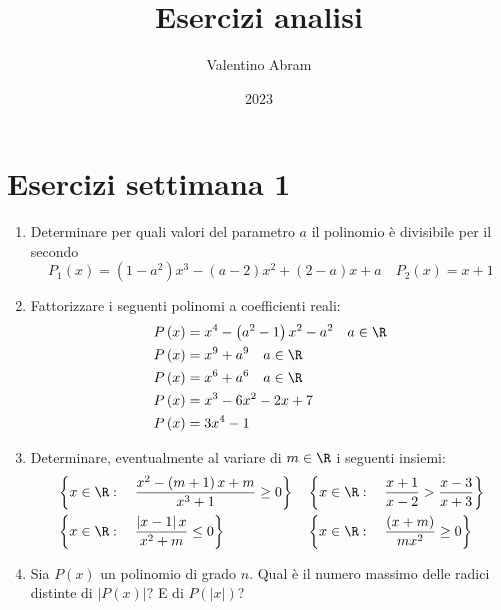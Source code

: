 \endofdump



\usepackage{enumitem,amssymb}
\newcommand{\IM}{\operatorname{Im}}
\newcommand{\RE}{\operatorname{Re}}

\title{Esercizi analisi}
\author{Valentino Abram}
\date{2023}


\maketitle
\tableofcontents
\newpage
\section{Esercizi settimana 1}
\begin{enumerate}
	\item Determinare per quali valori del parametro $ a $ il polinomio è divisibile per il secondo
	      \[
		      P_1\left(x\right) = \left(1-a^2 \right)x^3  - \left(a-2\right)x^2  + \left(2-a\right)x + a  \quad P_2\left(x\right) = x+1
	      \]
	\item Fattorizzare i seguenti polinomi a coefficienti reali:
	      \begin{align*}
		      P\left(x\right) & = x^{4} - \left(a^2  - 1\right)x^2  - a^2 \quad a \in  \R \\
		      P\left(x\right) & = x^{9}  + a^{9} \quad a \in  \R                          \\
		      P\left(x\right) & = x^{6} + a^{6} \quad a \in  \R                           \\
		      P\left(x\right) & = x^3  - 6x^2  - 2x + 7                                   \\
		      P\left(x\right) & = 3x^{4} -1
	      \end{align*}
	\item Determinare, eventualmente al variare di $ m \in  \R  $ i seguenti insiemi:
	      \begin{align*}
		       & \left\{x \in \R : \quad  \frac{x^2  - \left(m+1\right)x + m}{x^3  +1}\ge 0 \right\} &  & \left\{x \in  \R : \quad  \frac{x+1}{x-2} > \frac{x-3}{x+3}\right\}  \\
		       & \left\{x \in  \R : \quad \frac{\left|x-1\right|x}{x^2  + m} \le  0\right\}          &  & \left\{x \in \R : \quad \frac{\left(x+m\right)}{mx^2 } \ge 0\right\}
	      \end{align*}
	\item Sia $ P\left(x\right) $ un polinomio di grado $ n $. Qual è il numero massimo delle radici distinte di $ \left|P\left(x\right)\right| $? E di $ P\left(\left|x\right|\right) $?

\end{enumerate}
